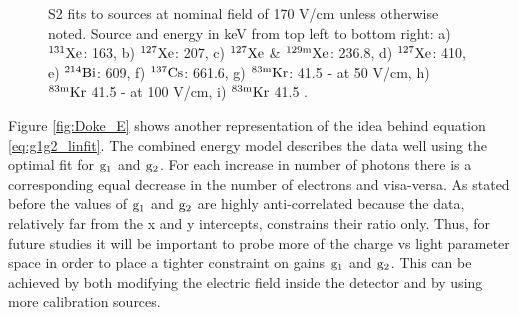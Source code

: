 \begin{figure}[h!]
\bigskip

\hfill
{}
\hfill
{}

\caption{S2 fits to sources at nominal field of 170 V/cm unless otherwise noted. Source and energy in keV from top left to bottom right: a) $\rm ^{131}Xe$: 163, b) $\rm ^{127}Xe$:  207, c) $\rm ^{127}Xe$ \&  $\rm ^{129m}Xe$: 236.8, d)  $\rm ^{127}Xe$: 410, e) $\rm ^{214}Bi$: 609, f) $\rm ^{137}Cs$: 661.6, g) $\rm ^{83m}Kr$: 41.5 - at 50 V/cm, h) $\rm ^{83m}Kr$ 41.5 - at 100 V/cm, i) $\rm ^{83m}Kr$ 41.5 .}
\label{fig:Doke_Fits_S2}
\end{figure}

\newpage

Figure \ref{fig:Doke_E} shows another representation of the idea behind equation \ref{eq:g1g2_linfit}. The combined energy model describes the data well using the optimal fit for $\rm g_1$ and $\rm g_2$. For each increase in number of photons there is a corresponding equal decrease in the number of electrons and visa-versa. As stated before the values of $\rm g_1$ and $\rm g_2$ are highly anti-correlated because the data, relatively far from the x and y intercepts, constrains their ratio only. Thus, for future studies it will be important to probe more of the charge vs light parameter space in order to place a tighter constraint on gains $\rm g_1$ and $\rm g_2$. This can be achieved by both modifying the electric field inside the detector and by using more calibration sources.


